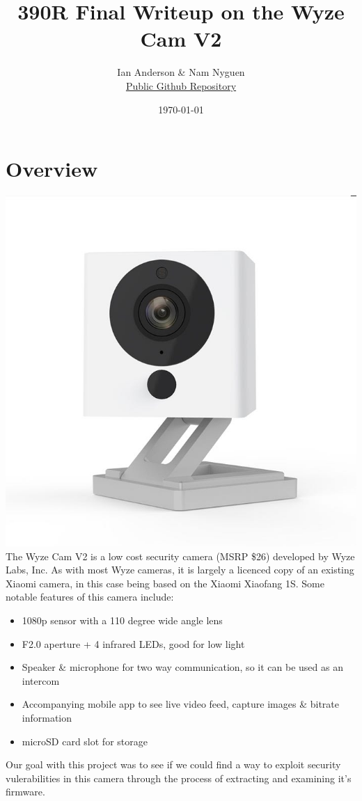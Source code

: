 \documentclass[a4paper, 11pt]{article}
\title{390R Final Writeup on the Wyze Cam V2}
\author{Ian Anderson \& Nam Nyguen\\\large \href{https://github.com/figamin/cs390r-final-wyze-cam}{Public Github Repository}}
\date{\today}
\begin{document}
\maketitle

\section{Overview}
\includegraphics[scale=0.5]{wyze}\newline
The Wyze Cam V2 is a low cost security camera (MSRP \$26) developed by Wyze Labs, Inc. As with most Wyze cameras, it is largely a licenced copy of an existing Xiaomi camera, in this case being based on the Xiaomi Xiaofang 1S.\newline\newline
Some notable features of this camera include:
\begin{itemize}
    \item 1080p sensor with a 110 degree wide angle lens
    \item F2.0 aperture + 4 infrared LEDs, good for low light
    \item Speaker \& microphone for two way communication, so it can be used as an intercom
    \item Accompanying mobile app to see live video feed, capture images \& bitrate information
    \item microSD card slot for storage 
  \end{itemize}
  Our goal with this project was to see if we could find a way to exploit security vulerabilities in this camera through the process of extracting and examining it's firmware.
\end{document}
